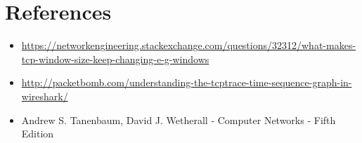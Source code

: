 \documentclass[a4paper]{article}
\begin{document}
\section*{References}
\begin{itemize}
    \item \href{https://networkengineering.stackexchange.com/questions/32312/what-makes-tcp-window-size-keep-changing-e-g-windows}{https://networkengineering.stackexchange.com/questions/32312/what-makes-tcp-window-size-keep-changing-e-g-windows}
    \item \href{http://packetbomb.com/understanding-the-tcptrace-time-sequence-graph-in-wireshark/}{http://packetbomb.com/understanding-the-tcptrace-time-sequence-graph-in-wireshark/}
    \item Andrew S. Tanenbaum, David J. Wetherall - Computer Networks - Fifth Edition
\end{itemize}
\end{document}
